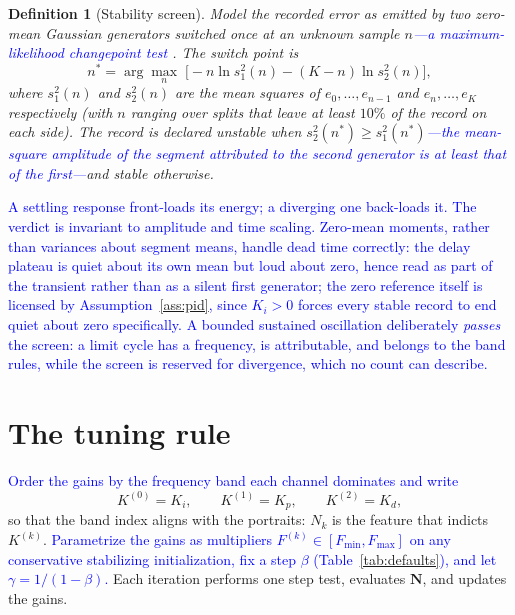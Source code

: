 \documentclass[final,3p,times,twocolumn]{elsarticle}
\newcommand{\rev}[1]{\textcolor{blue}{#1}}  %
\newcommand{\revc}[1]{\textcolor{blue}{#1}} %
\newcommand{\reve}[1]{\textcolor{blue}{#1}} %
\newcommand{\revh}[1]{\textcolor{blue}{#1}} %
\newtheorem{definition}{Definition}
\begin{document}
\begin{definition}[Stability screen]\label{def:screen}
Model the recorded error as emitted by two zero-mean Gaussian generators
switched once at an unknown sample $n$\revh{---a maximum-likelihood
changepoint test \cite{BassevilleNikiforov1993}}. The switch
point is
\begin{equation}
n^\ast = \arg\max_{n}\;
\bigl[-n \ln s_1^2(n) - (K-n)\ln s_2^2(n)\bigr],
\end{equation}
where $s_1^2(n)$ and $s_2^2(n)$ are the mean squares of
$e_0,\dots,e_{n-1}$ and $e_n,\dots,e_K$ respectively (with $n$
ranging over splits that leave at least $10\%$ of the record on each
side). The record is declared \emph{unstable} when
$s_2^2(n^\ast) \ge s_1^2(n^\ast)$\rev{---the mean-square amplitude
of the segment attributed to the second generator is at least that of
the first---}and \emph{stable} otherwise.
\end{definition}

\rev{A settling response front-loads its energy; a diverging one
back-loads it. \revc{The verdict is invariant to amplitude and time scaling.} Zero-mean moments, rather than
variances about segment means, handle dead time correctly: the delay
plateau is quiet about its own mean but loud about zero, hence read as
part of the transient rather than as a silent first generator; the zero
reference itself is licensed by Assumption~\ref{ass:pid}, since
$K_i > 0$ forces every stable record to end quiet about zero
specifically. A bounded sustained oscillation deliberately
\emph{passes} the screen: a limit cycle has a frequency, is
attributable, and belongs to the band rules, while the screen is
reserved for divergence, which no count can describe.}

\section{The tuning rule}
\label{sec:rule}

\revc{Order the gains by the frequency band each channel
dominates and write}
\begin{equation}
K^{(0)} = K_i, \qquad K^{(1)} = K_p, \qquad K^{(2)} = K_d,
\label{eq:bandorder}
\end{equation}
so that the band index aligns with the portraits: $N_k$ is the feature
that indicts $K^{(k)}$. \reve{Parametrize the gains as multipliers
$F^{(k)} \in [F_{\min}, F_{\max}]$ on any conservative stabilizing
initialization, fix a step $\beta$ (Table~\ref{tab:defaults}), and let
$\gamma = 1/(1-\beta)$.} Each iteration performs one step test,
evaluates $\mathbf N$, and updates the gains.
\end{document}
